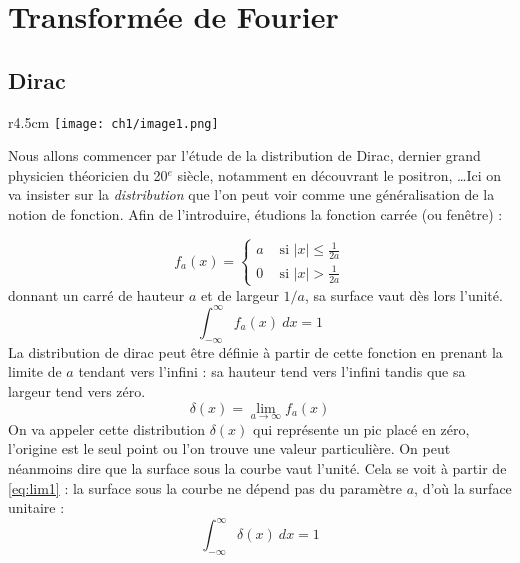 \setcounter{chapter}{-1}
\chapter{Transformée de Fourier}
\section{Dirac}
\begin{wrapfigure}[15]{r}{4.5cm}
\vspace{-5mm}
\texttt{[image: ch1/image1.png]}
\end{wrapfigure}
Nous allons commencer par l'étude de la distribution de Dirac, dernier grand 
physicien théoricien du 20$^e$ siècle, notamment en découvrant le positron, 
\dots Ici on va insister sur la \textit{distribution} que l'on peut voir comme 
une généralisation de la notion de fonction. Afin de l'introduire, étudions la 
fonction carrée (ou fenêtre) :


\begin{equation}
f_a(x) =\left\{\begin{array}{ll}
a &\text{ si } |x| \leq \frac{1}{2a}\\
0 &\text{ si } |x| > \frac{1}{2a}
\end{array}\right.
\end{equation}
donnant un carré de hauteur $a$ et de largeur $1/a$, sa surface vaut dès lors 
l'unité. 
\begin{equation}
\int_{-\infty}^\infty f_a(x)\ dx = 1
\label{eq:lim1}
\end{equation}
La distribution de dirac peut être définie à partir de cette fonction 
en prenant la limite de $a$ tendant vers l'infini : sa hauteur tend vers 
l'infini tandis que sa largeur tend vers zéro.
\begin{equation}
\delta(x) = \lim\limits_{a\rightarrow\infty} f_a(x)
\end{equation}
On va appeler cette distribution $\delta(x)$ qui représente un pic placé en 
zéro, l'origine est le seul point ou l'on trouve une valeur particulière. On 
peut néanmoins dire que la surface sous la courbe vaut l'unité. Cela se 
voit à partir de \autoref{eq:lim1} : la surface sous la courbe ne dépend pas 
du paramètre $a$, d'où la surface unitaire :
\begin{equation}
\int_{-\infty}^\infty \delta(x)\ dx = 1
\end{equation}

